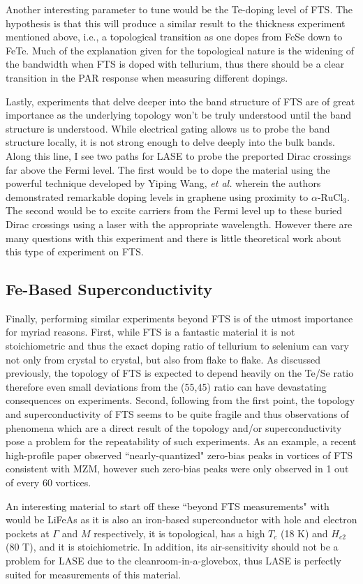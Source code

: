 Another interesting parameter to tune would be the Te-doping level of \ac{FTS}. The hypothesis is that this will produce a similar result to the thickness experiment mentioned above, i.e., a topological transition as one dopes from FeSe down to FeTe. Much of the explanation given for the topological nature is the widening of the bandwidth when FTS is doped with tellurium, thus there should be a clear transition in the \ac{PAR} response when measuring different dopings.\par
Lastly, experiments that delve deeper into the band structure of \ac{FTS} are of great importance as the underlying topology won't be truly understood until the band structure is understood. While electrical gating allows us to probe the band structure locally, it is not strong enough to delve deeply into the bulk bands. Along this line, I see two paths for LASE to probe the preported Dirac crossings far above the Fermi level. The first would be to dope the material using the powerful technique developed by Yiping Wang, \textit{et al.} wherein the authors demonstrated remarkable doping levels in graphene using proximity to $\alpha$-RuCl$_{3}$\cite{WangBalgley2020}. The second would be to excite carriers from the Fermi level up to these buried Dirac crossings using a laser with the appropriate wavelength. However there are many questions with this experiment and there is little theoretical work about this type of experiment on \ac{FTS}.
\subsection{Fe-Based Superconductivity}
Finally, performing similar experiments beyond \ac{FTS} is of the utmost importance for myriad reasons. First, while \ac{FTS} is a fantastic material it is not stoichiometric and thus the exact doping ratio of tellurium to selenium can vary not only from crystal to crystal, but also from flake to flake. As discussed previously, the topology of \ac{FTS} is expected to depend heavily on the Te/Se ratio therefore even small deviations from the (55,45) ratio can have devastating consequences on experiments. Second, following from the first point, the topology and superconductivity of \ac{FTS} seems to be quite fragile and thus observations of phenomena which are a direct result of the topology and/or superconductivity pose a problem for the repeatability of such experiments. As an example, a recent high-profile paper observed ``nearly-quantized" zero-bias peaks in vortices of \ac{FTS} consistent with \ac{MZM}, however such zero-bias peaks were only observed in 1 out of every 60 vortices\cite{Zhu2020, frolov2021}.\par
An interesting material to start off these ``beyond \ac{FTS} measurements" with would be LiFeAs as it is also an iron-based superconductor with hole and electron pockets at $\Gamma$ and $M$ respectively, it is topological, has a high $T_{c}$ (18 K) and $H_{c2}$ (80 T), and it is stoichiometric\cite{Nag2016, Zhang2019_2, Tapp2008}. In addition, its air-sensitivity should not be a problem for LASE due to the cleanroom-in-a-glovebox, thus LASE is perfectly suited for measurements of this material. 
